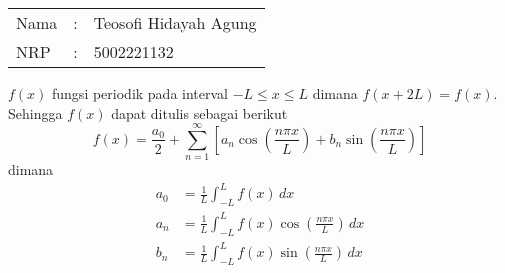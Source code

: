 \documentclass[10pt,openany,a4paper]{article}
\begin{document}
    \begin{tabular}{|lcl|}
     \hline
     Nama&:&Teosofi Hidayah Agung\\
     NRP&:&5002221132\\
     \hline
    \end{tabular}

    \begin{enumerate}
        \begin{tcolorbox}[title=Deret Fourier, colback=lightgray]
            $f(x)$ fungsi periodik pada interval $-L\leq x\leq L$ dimana $f(x+2L)=f(x)$.
            Sehingga $f(x)$ dapat ditulis sebagai berikut
            \[f(x)=\frac{a_0}{2}+\sum_{n=1}^{\infty}\left[a_n\cos\left(\frac{n\pi x}{L}\right)+b_n\sin\left(\frac{n\pi x}{L}\right)\right]\]
            dimana
            \begin{align}
                a_0&=\frac{1}{L}\int_{-L}^{L}f(x)\,dx\\
                a_n&=\frac{1}{L}\int_{-L}^{L}f(x)\cos\left(\frac{n\pi x}{L}\right)\,dx\\
                b_n&=\frac{1}{L}\int_{-L}^{L}f(x)\sin\left(\frac{n\pi x}{L}\right)\,dx
            \end{align}
        \end{tcolorbox}


\end{enumerate}
\end{document}
